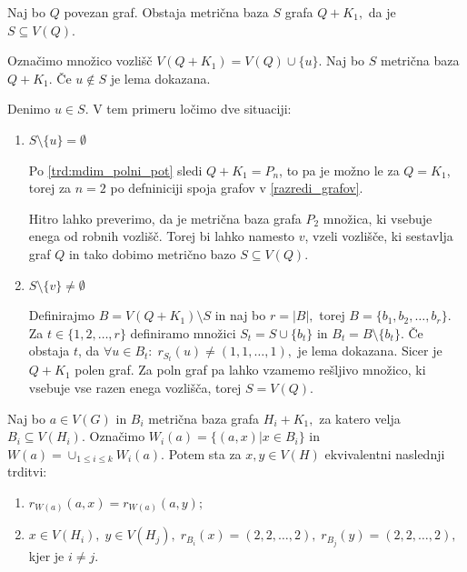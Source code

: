 \documentclass[mat1, tisk]{fmfdelo}
\newcommand{\1}{(1, 1, \ldots, 1)}
\newcommand{\2}{(2, 2, \ldots, 2)}
\begin{document}

\begin{lema} \label{lema:3}
    Naj bo $Q$ povezan graf. Obstaja metrična baza $S$ grafa $Q + K_1,$ da je 
    $S \subseteq V(Q).$
\end{lema}
\begin{dokaz}
    Označimo množico vozlišč $V(Q + K_1) = V(Q) \cup \{ u \}.$ Naj bo $S$ 
    metrična baza $Q + K_1$. Če $u \notin S$ je lema dokazana. 
    
    Denimo $u \in S.$ 
    V tem primeru ločimo dve situaciji:
    \begin{enumerate}
        \item $S \setminus \{ u \} = \emptyset$     
        
        Po \ref{trd:mdim_polni_pot} sledi $Q + K_1 = P_n$, to pa je možno le za $Q = K_1$, 
        torej za $n = 2$ po defniniciji spoja grafov v \ref{razredi_grafov}.
     
        Hitro lahko preverimo, da je metrična baza grafa $P_2$ množica, ki vsebuje enega 
        od robnih vozlišč. Torej bi lahko namesto $v$, vzeli vozlišče, ki sestavlja graf 
        $Q$ in tako dobimo metrično bazo $S \subseteq V(Q).$
        
        \item $S \setminus \{ v \} \not = \emptyset$ 
        
        Definirajmo $B = V(Q + K_1) \setminus S$ in naj bo $r = |B|,$ torej 
        $B = \{b_1, b_2, \ldots, b_r\}$. Za $t \in \{1, 2, \ldots, r\}$ definiramo množici 
        $S_t = S \cup \{b_t\}$ in $B_t = B \setminus \{b_t\}.$
        Če obstaja $t$, da $\forall u \in B_t : \; r_{S_t}(u) \not = (1, 1, \ldots, 1),$
        je lema dokazana. Sicer je $Q + K_1$ polen graf. Za poln graf pa lahko vzamemo
        rešljivo množico, ki vsebuje vse razen enega vozlišča, torej $S = V(Q).$
    \end{enumerate}
\end{dokaz}


\begin{lema} 
    Naj bo $a \in V(G)$ in $B_i$ metrična baza grafa $H_i + K_1,$ za katero velja $B_i \subseteq V(H_i).$
    Označimo $W_i(a) = \{(a,x) | x \in B_i\}$ in $W(a) = \cup_{1 \leq i \leq k} W_i(a)$. 
    Potem sta za $x, y \in V(H)$ ekvivalentni naslednji trditvi:
    \begin{enumerate}
        \item $r_{W(a)}(a, x) = r_{W(a)}(a, y);$
        \item $x \in V(H_i), \; y \in V(H_j), \; r_{B_i}(x) = \2, \; r_{B_j}(y) = \2,$ kjer je $i\neq j.$
    \end{enumerate}
\end{lema}
\end{document}
